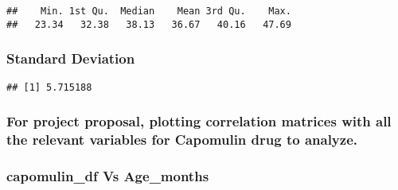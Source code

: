 \documentclass[
]{article}
\newenvironment{Shaded}{\begin{snugshade}}{\end{snugshade}}
\newcommand{\FunctionTok}[1]{\textcolor[rgb]{0.00,0.00,0.00}{#1}}
\newcommand{\NormalTok}[1]{#1}
\newcommand{\SpecialCharTok}[1]{\textcolor[rgb]{0.00,0.00,0.00}{#1}}
\begin{document}
\begin{verbatim}
##    Min. 1st Qu.  Median    Mean 3rd Qu.    Max. 
##   23.34   32.38   38.13   36.67   40.16   47.69
\end{verbatim}

\hypertarget{standard-deviation}{%
\subsubsection{Standard Deviation}\label{standard-deviation}}

\begin{Shaded}
\end{Shaded}

\begin{verbatim}
## [1] 5.715188
\end{verbatim}

\hypertarget{for-project-proposal-plotting-correlation-matrices-with-all-the-relevant-variables-for-capomulin-drug-to-analyze.}{%
\subsubsection{For project proposal, plotting correlation matrices with
all the relevant variables for Capomulin drug to
analyze.}\label{for-project-proposal-plotting-correlation-matrices-with-all-the-relevant-variables-for-capomulin-drug-to-analyze.}}

\hypertarget{capomulin_df-vs-age_months}{%
\subsubsection{capomulin\_df Vs
Age\_months}\label{capomulin_df-vs-age_months}}
\end{document}
